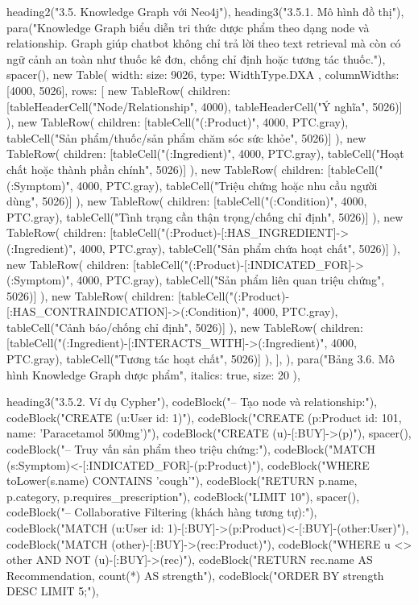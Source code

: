 {{{  heading2("3.5. Knowledge Graph với Neo4j"),
  heading3("3.5.1. Mô hình đồ thị"),
  para("Knowledge Graph biểu diễn tri thức dược phẩm theo dạng node và relationship. Graph giúp chatbot không chỉ trả lời theo text retrieval mà còn có ngữ cảnh an toàn như thuốc kê đơn, chống chỉ định hoặc tương tác thuốc."),
  spacer(),
  new Table({
    width: { size: 9026, type: WidthType.DXA },
    columnWidths: [4000, 5026],
    rows: [
      new TableRow({ children: [tableHeaderCell("Node/Relationship", 4000), tableHeaderCell("Ý nghĩa", 5026)] }),
      new TableRow({ children: [tableCell("(:Product)", 4000, PTC.gray), tableCell("Sản phẩm/thuốc/sản phẩm chăm sóc sức khỏe", 5026)] }),
      new TableRow({ children: [tableCell("(:Ingredient)", 4000, PTC.gray), tableCell("Hoạt chất hoặc thành phần chính", 5026)] }),
      new TableRow({ children: [tableCell("(:Symptom)", 4000, PTC.gray), tableCell("Triệu chứng hoặc nhu cầu người dùng", 5026)] }),
      new TableRow({ children: [tableCell("(:Condition)", 4000, PTC.gray), tableCell("Tình trạng cần thận trọng/chống chỉ định", 5026)] }),
      new TableRow({ children: [tableCell("(:Product)-[:HAS_INGREDIENT]->(:Ingredient)", 4000, PTC.gray), tableCell("Sản phẩm chứa hoạt chất", 5026)] }),
      new TableRow({ children: [tableCell("(:Product)-[:INDICATED_FOR]->(:Symptom)", 4000, PTC.gray), tableCell("Sản phẩm liên quan triệu chứng", 5026)] }),
      new TableRow({ children: [tableCell("(:Product)-[:HAS_CONTRAINDICATION]->(:Condition)", 4000, PTC.gray), tableCell("Cảnh báo/chống chỉ định", 5026)] }),
      new TableRow({ children: [tableCell("(:Ingredient)-[:INTERACTS_WITH]->(:Ingredient)", 4000, PTC.gray), tableCell("Tương tác hoạt chất", 5026)] }),
    ],
  }),
  para("Bảng 3.6. Mô hình Knowledge Graph dược phẩm", { italics: true, size: 20 }),

  heading3("3.5.2. Ví dụ Cypher"),
  codeBlock("-- Tạo node và relationship:"),
  codeBlock("CREATE (u:User {id: 1})"),
  codeBlock("CREATE (p:Product {id: 101, name: 'Paracetamol 500mg'})"),
  codeBlock("CREATE (u)-[:BUY]->(p)"),
  spacer(),
  codeBlock("-- Truy vấn sản phẩm theo triệu chứng:"),
  codeBlock("MATCH (s:Symptom)<-[:INDICATED_FOR]-(p:Product)"),
  codeBlock("WHERE toLower(s.name) CONTAINS 'cough'"),
  codeBlock("RETURN p.name, p.category, p.requires_prescription"),
  codeBlock("LIMIT 10"),
  spacer(),
  codeBlock("-- Collaborative Filtering (khách hàng tương tự):"),
  codeBlock("MATCH (u:User {id: 1})-[:BUY]->(p:Product)<-[:BUY]-(other:User)"),
  codeBlock("MATCH (other)-[:BUY]->(rec:Product)"),
  codeBlock("WHERE u <> other AND NOT (u)-[:BUY]->(rec)"),
  codeBlock("RETURN rec.name AS Recommendation, count(*) AS strength"),
  codeBlock("ORDER BY strength DESC LIMIT 5;"),

}}}
